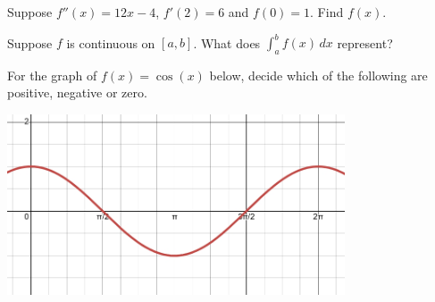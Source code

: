 \documentclass[11pt, addpoints]{exam}
\begin{document}
\begin{questions}
\question Suppose $f''(x) = 12x - 4$, $f'(2) = 6$ and $f(0) = 1$. Find $f(x).$
\pagebreak


\question Suppose $f$ is continuous on $[a,b]$. What does $\displaystyle\int_a^b f(x)\, dx$ represent?
\vspace{1in}

\question For the graph of $f(x)=\cos(x)$ below, decide which of the following are positive, negative or zero. 

\begin{center}
\includegraphics[width=0.75\textwidth]{Images/F24M241 PMT2 pic 1.jpeg}
\end{center}


\end{questions}
\end{document}
